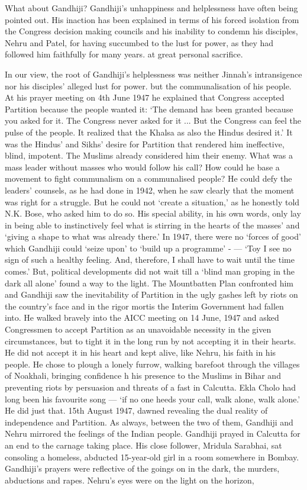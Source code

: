 \begin{multicols}{2}
What about Gandhiji? Gandhiji's unhappiness and helplessness have often being pointed out. His inaction has been explained in terms of his forced isolation from the Congress decision making councils and his inability to condemn his disciples, Nehru and Patel, for having succumbed to the lust for power, as they had followed him faithfully for many years. at great personal sacrifice. 

In our view, the root of Gandhiji's helplessness was neither Jinnah's intransigence nor his disciples' alleged lust for power. but the communalisation of his people. At his prayer meeting on 4th June 1947 he explained that Congress accepted Partition because the people wanted it: `The demand has been granted because you asked for it. The Congress never asked for it ... But the Congress can feel the pulse of the people. It realized that the Khalsa as also the Hindus desired it.' It was the Hindus' and Sikhs' desire for Partition that rendered him ineffective, blind, impotent. The Muslims already considered him their enemy. What was a mass leader without masses who would follow his call? How could he base a movement to fight communalism on a communalised people? He could defy the leaders' counsels, as he had done in 1942, when he saw clearly that the moment was right for a struggle. But he could not `create a situation,' as he honestly told N.K. Bose, who asked him to do so. His special ability, in his own words, only lay in being able to instinctively feel what is stirring in the hearts of the masses' and `giving a shape to what was already there.' In 1947, there were no `forces of good' which Gandhiji could `seize upon' to `build up a programme' - --- `Toy I see no sign of such a healthy feeling. And, therefore, I shall have to wait until the time comes.' But, political developments did not wait till a `blind man groping in the dark all alone' found a way to the light. The Mountbatten Plan confronted him and Gandhiji saw the inevitability of Partition in the ugly gashes left by riots on the country's face and in the rigor mortis the Interim Government had fallen into. He walked bravely into the AICC meeting on 14 June, 1947 and asked Congressmen to accept Partition as an unavoidable necessity in the given circumstances, but to tight it in the long run by not accepting it in their hearts. He did not accept it in his heart and kept alive, like Nehru, his faith in his people. He chose to plough a lonely furrow, walking barefoot through the villages of Noakhali, bringing confidence h his presence to the Muslims in Bihar and preventing riots by persuasion and threats of a fast in Calcutta. Ekla Cholo had long been his favourite song --- `if no one heeds your call, walk alone, walk alone.' He did just that. 15th August 1947, dawned revealing the dual reality of independence and Partition. As always, between the two of them, Gandhiji and Nehru mirrored the feelings of the Indian people. Gandhiji prayed in Calcutta for an end to the carnage taking place. His close follower, Mridula Sarabhai, sat consoling a homeless, abducted 15-year-old girl in a room somewhere in Bombay. Gandhiji's prayers were reflective of the goings on in the dark, the murders, abductions and rapes. Nehru's eyes were on the light on the horizon, 
\end{multicols}

